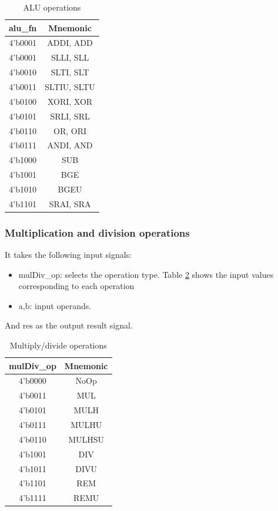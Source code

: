 \documentclass[../main.tex]{subfiles}
\begin{document}
\begin{table}[h!]
\begin{center}
\begin{tabular}{|c | c|}
    \hline
    alu\_fn & Mnemonic\\
    \hline
    4'b0001 & ADDI, ADD  \\ 
    \hline
	4'b0001 & SLLI, SLL  \\
	\hline
	4'b0010 & SLTI, SLT  \\
	\hline
	4'b0011 & SLTIU, SLTU \\
	\hline
	4'b0100 & XORI, XOR  \\
	\hline
	4'b0101 & SRLI, SRL  \\
	\hline
	4'b0110 & OR, ORI \\ 
	\hline
	4'b0111 & ANDI, AND \\
	\hline
	4'b1000 & SUB \\
	\hline
	4'b1001 & BGE\\  
	\hline
	4'b1010 & BGEU \\ 
	\hline
	4'b1101 & SRAI, SRA \\
	\hline
\end{tabular}
\end{center}
\caption{ALU operations}
\label{ch4.1}
\end{table}

\subsubsection{Multiplication and division operations}
It takes the following input signals:
\begin{itemize}
   \item  mulDiv\_op: selects the operation type. Table \ref{ch4.2} shows the input values corresponding to each operation
   \item a,b: input operands.
\end{itemize}

And res as the output result signal.

\begin{table}[h!]
\begin{center}
\begin{tabular}{|c | c|}
    \hline
    mulDiv\_op & Mnemonic\\
    \hline
    4'b0000 & NoOp  \\ 
    \hline
	4'b0011 & MUL  \\
	\hline
	4'b0101 & MULH  \\
	\hline
	4'b0111 & MULHU \\
	\hline
	4'b0110 & MULHSU  \\
	\hline
	4'b1001 & DIV  \\
	\hline
	4'b1011 & DIVU \\ 
	\hline
	4'b1101 & REM \\
	\hline
	4'b1111 & REMU \\
	\hline
\end{tabular}
\end{center}
\caption{Multiply/divide operations}
\label{ch4.2}
\end{table}
\end{document}
